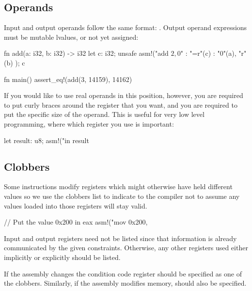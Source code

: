 \subsection*{Operands}

Input and output operands follow the same format: . 
Output operand expressions must be mutable lvalues, or not yet assigned:

\begin{rustc}
fn add(a: i32, b: i32) -> i32 {
    let c: i32;
    unsafe {
        asm!("add $2, $0"
             : "=r"(c)
             : "0"(a), "r"(b)
             );
    }
    c
}

fn main() {
    assert_eq!(add(3, 14159), 14162)
}
\end{rustc}

If you would like to use real operands in this position, however, you are required to put curly braces \code{\{\}} around the 
register that you want, and you are required to put the specific size of the operand. This is useful for very low level programming, 
where which register you use is important:

\begin{rustc}
let result: u8;
asm!("in %
result
\end{rustc}

\subsection*{Clobbers}

Some instructions modify registers which might otherwise have held different values so we use the clobbers list to indicate 
to the compiler not to assume any values loaded into those registers will stay valid.

\begin{rustc}
// Put the value 0x200 in eax
asm!("mov $$0x200, %
\end{rustc}

Input and output registers need not be listed since that information is already communicated by the given constraints. 
Otherwise, any other registers used either implicitly or explicitly should be listed.

\blank

If the assembly changes the condition code register  should be specified as one of the clobbers. Similarly, if 
the assembly modifies memory,  should also be specified.

